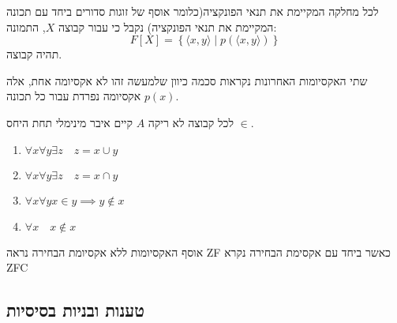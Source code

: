 \documentclass{tstextbook}
\begin{document}
\begin{definition}
לכל מחלקה המקיימת את תנאי הפונקציה(כלומר אוסף של זוגות סדורים ביחד עם תכונה המקיימת את תנאי הפונקציה) נקבל כי עבור קבוצה \(X\), התמונה:
$$F[X]=\left\{  \langle x,y \rangle \mid p\left( \langle x,y \rangle  \right)  \right\}$$
תהיה קבוצה.

\end{definition}
\begin{remark}
שתי האקסיומות האחרונות נקראות סכמה כיוון שלמעשה זהו לא אקסיומה אחת, אלה אקסיומה נפרדת עבור כל תכונה \(p(x)\).

\end{remark}
\begin{definition}
לכל קבוצה לא ריקה \(A\) קיים איבר מינימלי תחת היחס \(\in\). 

\end{definition}
\begin{corollary}
  \begin{enumerate}
    \item \(\forall x\forall y \exists z\quad z = x\cup y\)


    \item \(\forall x\forall y \exists z\quad z=x\cap y\)


    \item \(\forall x \forall y x \in y \implies y \not \in x\)


    \item \(\forall x \quad x \not \in x\)


  \end{enumerate}
\end{corollary}
\begin{remark}
אוסף האקסיומות ללא אקסיומת הבחירה נראה ZF כאשר ביחד עם אקסימת הבחירה נקרא ZFC

\end{remark}
\subsection{טענות ובניות בסיסיות}
\end{document}
